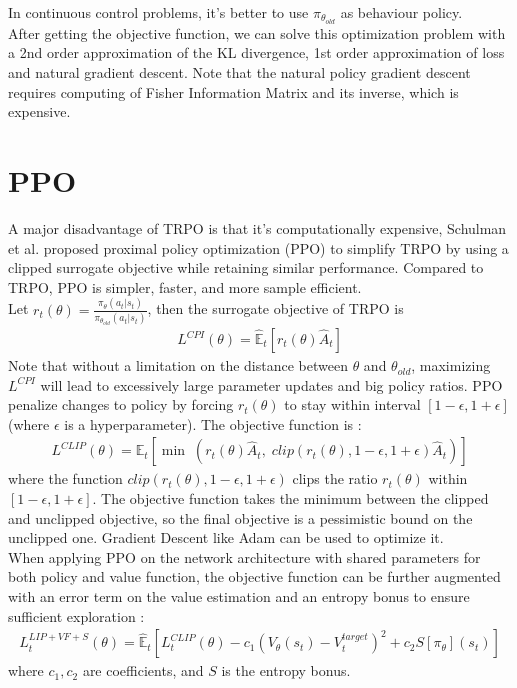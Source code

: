 \documentclass{article}
\begin{document}
In continuous control problems, it's better to use $\pi_{\theta_{old}}$ as behaviour policy. \\

After getting the objective function, we can solve this optimization problem with a 2nd order approximation of the KL divergence, 1st order approximation of loss and natural gradient descent. Note that the natural policy gradient descent requires computing of Fisher Information Matrix and its inverse, which is expensive. 

\section{PPO}
A major disadvantage of TRPO is that it's computationally expensive, Schulman et al. proposed proximal policy optimization (PPO) to simplify TRPO by using a clipped surrogate objective while retaining similar performance. Compared to TRPO, PPO is simpler, faster, and more sample efficient. \\

Let $r_{t}(\theta) = \frac{\pi_{\theta}(a_{t}|s_{t})}{\pi_{\theta_{old}}(a_{t}|s_{t})}$, then the surrogate objective of TRPO is \begin{eqnarray}
L^{CPI}(\theta) = \hat{\mathbb{E}}_{t}\left[r_{t}(\theta)\hat{A}_{t}\right]
\end{eqnarray}
Note that without a limitation on the distance between $\theta$ and $\theta_{old}$, maximizing $L^{CPI}$ will lead to excessively large parameter updates and big policy ratios. PPO penalize changes to policy by forcing $r_{t}(\theta)$ to stay within interval $[1-\epsilon, 1+\epsilon]$ (where $\epsilon$ is a hyperparameter). The objective function is : \begin{eqnarray}
L^{CLIP}(\theta) = \hat{\mathbb{E}}_{t}\left[\min\; (r_{t}(\theta)\hat{A}_{t},\; clip(r_{t}(\theta),1-\epsilon, 1+\epsilon)\hat{A}_{t})\right]
\end{eqnarray}
where the function $clip(r_{t}(\theta),1-\epsilon, 1+\epsilon)$ clips the ratio $r_{t}(\theta)$ within $[1-\epsilon, 1+\epsilon]$. The objective function takes the minimum between the clipped and unclipped objective, so the final objective is a pessimistic bound on the unclipped one. Gradient Descent like Adam can be used to optimize it.\\

When applying PPO on the network architecture with shared parameters for both policy and value function, the objective function can be further augmented with an error term on the value estimation and an entropy bonus to ensure sufficient exploration : \begin{eqnarray}
L_{t}^{LIP+VF+S}(\theta) = \hat{\mathbb{E}}_{t}\left[L_{t}^{CLIP}(\theta) - c_{1}(V_{\theta}(s_{t}) - V_{t}^{target})^{2} + c_{2}S[\pi_{\theta}](s_{t})\right]
\end{eqnarray}
where $c_{1},c_{2}$ are coefficients, and $S$ is the entropy bonus. 
\end{document}
